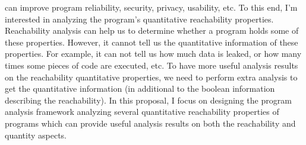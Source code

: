 can improve program reliability, security, privacy, usability, etc.
To this end, I'm interested in
analyzing the program's quantitative reachability properties.
Reachability analysis can help us to determine whether a program holds some of these properties.
However, it cannot tell us
the quantitative information of these properties.
For example, it can not tell us how much data is leaked, or
how many times some pieces of code are executed, etc.
To have more useful analysis results on the reachability quantitative properties,
we need to perform extra analysis
to get the quantitative information
(in additional to the boolean information describing the reachability).
In this proposal, I focus on designing
the program analysis framework analyzing several quantitative reachability properties of programs
which can provide useful analysis results on both the reachability and quantity aspects.

